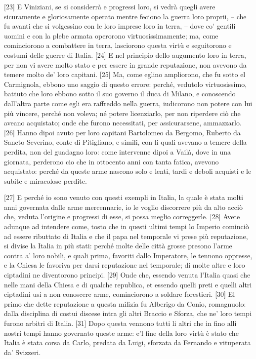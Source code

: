 {[}23{]} E Viniziani, se si considerrà e progressi loro, si vedrà quegli
avere sicuramente e gloriosamente operato mentre feciono la guerra loro
proprii, -- che fu avanti che si volgessino con le loro imprese loro in
terra, -- dove co' gentili uomini e con la plebe armata operorono
virtuosissimamente; ma, come cominciorono a combattere in terra,
lasciorono questa virtù e seguitorono e costumi delle guerre di Italia.
{[}24{]} E nel principio dello augumento loro in terra, per non vi avere
molto stato e per essere in grande reputazione, non avevono da temere
molto de' loro capitani. {[}25{]} Ma, come eglino ampliorono, che fu
sotto el Carmignola, ebbono uno saggio di questo errore: perché,
vedutolo virtuosissimo, battuto che loro ebbono sotto il suo governo il
duca di Milano, e conoscendo dall'altra parte come egli era raffreddo
nella guerra, iudicorono non potere con lui più vincere, perché non
voleva; né potere licenziarlo, per non riperdere ciò che aveano
acquistato; onde che furono necessitati, per assicurarsene, ammazzarlo.
{[}26{]} Hanno dipoi avuto per loro capitani Bartolomeo da Bergomo,
Ruberto da Sancto Severino, conte di Pitigliano, e simili, con li quali
avevano a temere della perdita, non del guadagno loro: come intervenne
dipoi a Vailà, dove in una giornata, perderono cio che in ottocento anni
con tanta fatica, avevono acquistato: perché da queste arme nascono solo
e lenti, tardi e deboli acquisti e le subite e miracolose perdite.

{[}27{]} E perché io sono venuto con questi exempli in Italia, la quale
è stata molti anni governata dalle arme mercennarie, io le voglio
discorrere più da alto acciò che, veduta l'origine e progressi di esse,
si possa meglio correggerle. {[}28{]} Avete adunque ad intendere come,
tosto che in questi ultimi tempi lo Imperio cominciò ad essere ributtato
di Italia e che il papa nel temporale vi prese più reputazione, si
divise la Italia in più stati: perché molte delle città grosse presono
l'arme contra a' loro nobili, e quali prima, favoriti dallo Imperatore,
le tennono oppresse, e la Chiesa le favoriva per darsi reputazione nel
temporale; di molte altre e loro ciptadini ne diventorono principi.
{[}29{]} Onde che, essendo venuta l'Italia quasi che nelle mani della
Chiesa e di qualche republica, et essendo quelli preti e quelli altri
ciptadini usi a non conoscere arme, cominciorono a soldare forestieri.
{[}30{]} El primo che dette reputazione a questa milizia fu Alberigo da
Conio, romagnuolo: dalla disciplina di costui discese intra gli altri
Braccio e Sforza, che ne' loro tempi furono arbitri di Italia. {[}31{]}
Dopo questa vennono tutti li altri che in fino alli nostri tempi hanno
governato queste arme: e'l fine della loro virtù è stato che Italia è
stata corsa da Carlo, predata da Luigi, sforzata da Fernando e
vituperata da' Svizzeri.

